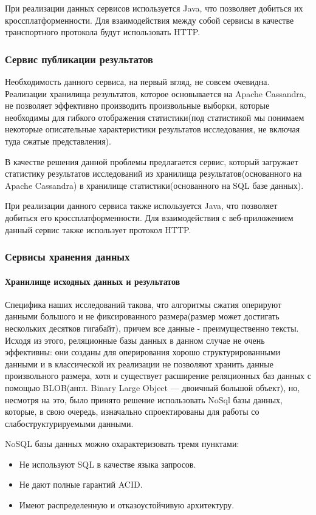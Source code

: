\documentclass[12pt,a4paper]{extarticle}
\begin{document}
При реализации данных сервисов используется Java, что позволяет добиться их кроссплатформенности. Для взаимодействия между собой сервисы в качестве транспортного протокола будут использовать HTTP.

\subsubsection{Сервис публикации результатов}
Необходимость данного сервиса, на первый вгляд, не совсем очевидна. Реализации хранилища результатов, которое основывается на Apache Cassandra, не позволяет эффективно производить произвольные выборки, которые необходимы для гибкого отображения статистики(под статистикой мы понимаем некоторые описательные характеристики результатов исследования, не включая туда сжатые представления).

В качестве решения данной проблемы предлагается сервис, который загружает статистику результатов исследований из хранилища результатов(основанного на Apache Cassandra) в хранилище статистики(основанного на SQL базе данных).

При реализации данного сервиса также используется Java, что позволяет добиться его кроссплатформенности. Для взаимодействия с веб-приложением данный сервис также использует протокол HTTP.

\subsubsection{Сервисы хранения данных}
\paragraph{Хранилище исходных данных и результатов}

Специфика наших исследований такова, что алгоритмы сжатия оперируют данными большого и не фиксированного размера(размер может достигать нескольких десятков гигабайт), причем все данные - преимущественно тексты. Исходя из этого, реляционные базы данных в данном случае не очень эффективны: они созданы для оперирования хорошо структурированными данными и в классической их реализации не позволяют хранить данные произвольного размера, хотя и существует расширение реляционных баз данных с помощью BLOB(англ. Binary Large Object — двоичный большой объект), но, несмотря на это, было принято решение использовать NoSql базы данных, которые, в свою очередь, изначально спроектированы для работы со слабоструктурируемыми данными. 

NoSQL базы данных можно охарактеризовать тремя пунктами:
\begin{itemize}
	\item Не используют SQL в качестве языка запросов. 
	\item Не дают полные гарантий ACID.
	\item Имеют распределенную и отказоустойчивую архитектуру.
\end{itemize}
\end{document}
